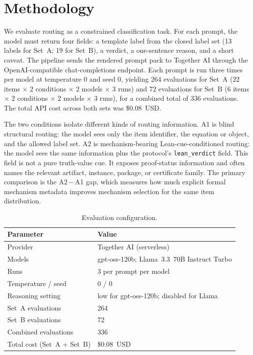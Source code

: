 \documentclass[11pt]{article}
\begin{document}
\section{Methodology}
\label{sec:methodology}

We evaluate routing as a constrained classification task. For each prompt,
the model must return four fields: a template label from the closed label set
(13 labels for Set~A; 19 for Set~B), a verdict, a one-sentence reason, and a short caveat. The
pipeline sends the rendered prompt pack to Together AI through the
OpenAI-compatible chat-completions endpoint. Each prompt is run three times
per model at temperature $0$ and seed $0$, yielding 264 evaluations for Set~A
($22$ items $\times$ $2$ conditions $\times$ $2$ models $\times$ $3$ runs)
and 72 evaluations for Set~B
($6$ items $\times$ $2$ conditions $\times$ $2$ models $\times$ $3$ runs),
for a combined total of 336 evaluations.
The total API cost across both sets was \$0.08~USD.

The two conditions isolate different kinds of routing information. A1 is
blind structural routing: the model sees only the item identifier, the
equation or object, and the allowed label set. A2 is mechanism-bearing
Lean-cue-conditioned routing: the model sees the same information plus the
protocol's \texttt{lean\_verdict} field. This field is not a pure truth-value
cue. It exposes proof-status information and often names the relevant
artifact, instance, package, or certificate family. The primary comparison is
the A2\,$-$\,A1 gap, which measures how much explicit formal mechanism
metadata improves mechanism selection for the same item distribution.

\begin{table}[t]
\centering
\begin{tabular}{ll}
\toprule
Parameter & Value \\
\midrule
Provider & Together AI (serverless) \\
Models & gpt-oss-120b; Llama~3.3~70B Instruct Turbo \\
Runs & 3 per prompt per model \\
Temperature / seed & $0$ / $0$ \\
Reasoning setting & low for gpt-oss-120b; disabled for Llama \\
Set~A evaluations & 264 \\
Set~B evaluations & 72 \\
Combined evaluations & 336 \\
Total cost (Set~A + Set~B) & \$0.08~USD \\
\bottomrule
\end{tabular}
\caption{Evaluation configuration.}
\label{tab:method-config}
\end{table}
\end{document}
